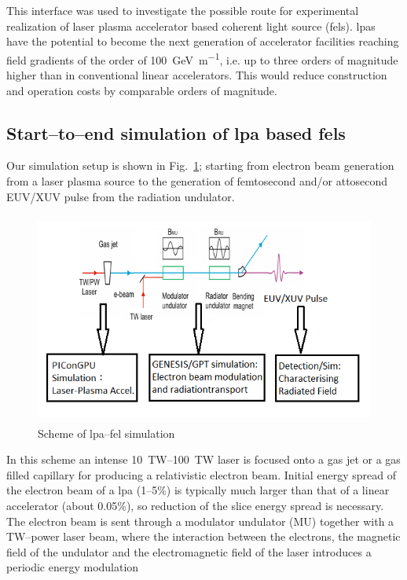 This interface was used to investigate the possible
route for experimental realization of laser plasma accelerator based coherent
light source (\glspl{fel})\cite{Emma2004}. \Glspl{lpa}~\cite{Leemans2006,Esarey2009,Tajima1979} have the potential to become the next
generation of accelerator facilities reaching field gradients of the order of
\SI{100}{\giga\electronvolt\per\metre}, i.e. up to three orders of magnitude
higher than in conventional linear accelerators. This would reduce construction
and operation costs by comparable orders of magnitude.

\subsection{Start--to--end simulation of \gls{lpa} based \glspl{fel}\label{sec:lwfa_s2e}}
Our simulation setup is shown in Fig.~\ref{fig:lwfa-setup}; starting from electron
beam generation from a laser plasma source to the generation of femtosecond
and/or attosecond EUV/XUV pulse from the radiation undulator.
%
\begin{figure}[ht]
  \includegraphics[width=5.4165in,height=2.7374in]{figures/lwfafel-img001.png}
  \caption{Scheme of \gls{lpa}--\gls{fel} simulation}
  \label{fig:lwfa-setup}
\end{figure}
%
In this scheme an intense
\SIrange{10}{100}{\tera\watt}
laser is focused onto a gas jet or a gas filled capillary for producing a
relativistic electron beam. Initial energy spread of the electron beam of a
\gls{lpa} (\numrange{1}{5}\%) is typically much larger than that of a linear accelerator
(about \num{0.05}\%), so
reduction of the slice energy spread is necessary. The electron beam is sent
through a modulator undulator (MU) together with a TW--power laser beam, where
the interaction between the electrons, the magnetic field of the undulator and
the electromagnetic field of the laser introduces a periodic energy modulation
